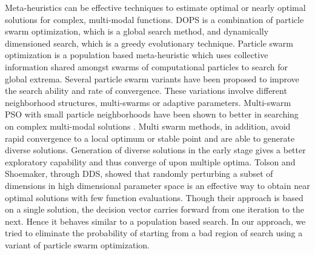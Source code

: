 \documentclass[12pt]{article}
\begin{document}
Meta-heuristics can be effective techniques to estimate optimal or nearly optimal solutions for complex, multi-modal functions.
DOPS is a combination of particle swarm optimization, which is a global search method, and dynamically dimensioned search, which is a greedy evolutionary technique.
Particle swarm optimization is a population based meta-heuristic which uses collective information shared amongst swarms of computational particles to
search for global extrema. Several particle swarm variants have been proposed to improve the search ability and rate of convergence. These variations involve different neighborhood structures, multi-swarms or adaptive parameters. Multi-swarm PSO with small particle neighborhoods have been shown to better in searching on complex multi-modal solutions \cite{zhao2008dynamic}.
Multi swarm methods, in addition, avoid rapid convergence to a local optimum or stable point and are able to generate diverse solutions.  Generation of diverse solutions in the early stage gives a better exploratory capability and thus converge of upon multiple optima.
Tolson and Shoemaker, through DDS, showed that randomly perturbing a subset of dimensions in high dimensional parameter space is an effective way to obtain near optimal solutions with few function evaluations. Though their approach is based on a single solution, the decision vector carries forward from one iteration to the next. Hence it behaves similar to a population based search. In our approach, we tried to eliminate the probability of starting from a bad region of search using a variant of particle swarm optimization.
\end{document}
